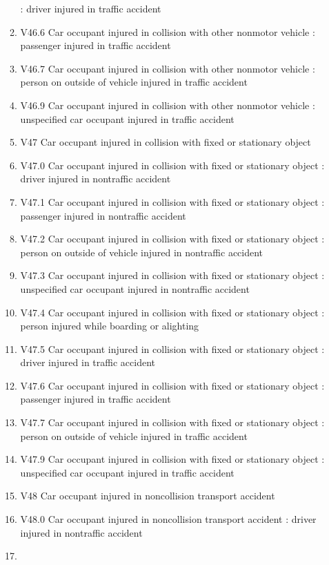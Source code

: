 \documentclass[
]{scrartcl}
\begin{document}
\begin{itemize}
\begin{enumerate}
    : driver injured in traffic accident
  \item
    V46.6 Car occupant injured in collision with other nonmotor vehicle
    : passenger injured in traffic accident
  \item
    V46.7 Car occupant injured in collision with other nonmotor vehicle
    : person on outside of vehicle injured in traffic accident
  \item
    V46.9 Car occupant injured in collision with other nonmotor vehicle
    : unspecified car occupant injured in traffic accident
  \item
    V47 Car occupant injured in collision with fixed or stationary
    object
  \item
    V47.0 Car occupant injured in collision with fixed or stationary
    object : driver injured in nontraffic accident
  \item
    V47.1 Car occupant injured in collision with fixed or stationary
    object : passenger injured in nontraffic accident
  \item
    V47.2 Car occupant injured in collision with fixed or stationary
    object : person on outside of vehicle injured in nontraffic accident
  \item
    V47.3 Car occupant injured in collision with fixed or stationary
    object : unspecified car occupant injured in nontraffic accident
  \item
    V47.4 Car occupant injured in collision with fixed or stationary
    object : person injured while boarding or alighting
  \item
    V47.5 Car occupant injured in collision with fixed or stationary
    object : driver injured in traffic accident
  \item
    V47.6 Car occupant injured in collision with fixed or stationary
    object : passenger injured in traffic accident
  \item
    V47.7 Car occupant injured in collision with fixed or stationary
    object : person on outside of vehicle injured in traffic accident
  \item
    V47.9 Car occupant injured in collision with fixed or stationary
    object : unspecified car occupant injured in traffic accident
  \item
    V48 Car occupant injured in noncollision transport accident
  \item
    V48.0 Car occupant injured in noncollision transport accident :
    driver injured in nontraffic accident
  \item

\end{enumerate}
\end{itemize}
\end{document}
